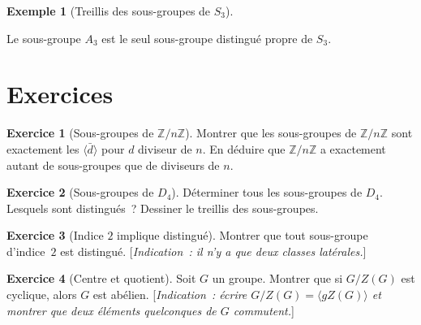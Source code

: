 \documentclass[12pt,a4paper,openany]{book}
\theoremstyle{definition}
\newtheorem{exemple}{Exemple}[chapter]
\newtheorem{exercice}{Exercice}[chapter]
\newcommand{\Z}{\mathbb{Z}}
\newcommand{\gen}[1]{\langle #1 \rangle}
\begin{document}
\begin{exemple}[Treillis des sous-groupes de $S_3$]
\label{ex:treillis-S3}
\begin{center}
\end{center}
Le sous-groupe $A_3$ est le seul sous-groupe distingué propre de $S_3$.
\end{exemple}

\section{Exercices}
\label{sec:ch2-exercices}

\begin{exercice}[Sous-groupes de $\Z/n\Z$]
\label{exo:sg-ZnZ}
Montrer que les sous-groupes de $\Z/n\Z$ sont exactement les $\gen{\bar{d}}$ pour $d$
diviseur de $n$. En déduire que $\Z/n\Z$ a exactement autant de sous-groupes que de
diviseurs de $n$.
\end{exercice}

\begin{exercice}[Sous-groupes de $D_4$]
\label{exo:sg-D4}
Déterminer tous les sous-groupes de $D_4$. Lesquels sont distingués~? Dessiner le treillis
des sous-groupes.
\end{exercice}

\begin{exercice}[Indice $2$ implique distingué]
\label{exo:indice-2}
Montrer que tout sous-groupe d'indice~$2$ est distingué. [\emph{Indication~: il n'y a que
deux classes latérales.}]
\end{exercice}

\begin{exercice}[Centre et quotient]
\label{exo:G-sur-ZG-cyclique}
Soit $G$ un groupe. Montrer que si $G/Z(G)$ est cyclique, alors $G$ est abélien.
[\emph{Indication~: écrire $G/Z(G) = \gen{gZ(G)}$ et montrer que deux éléments
quelconques de $G$ commutent.}]
\end{exercice}
\end{document}
